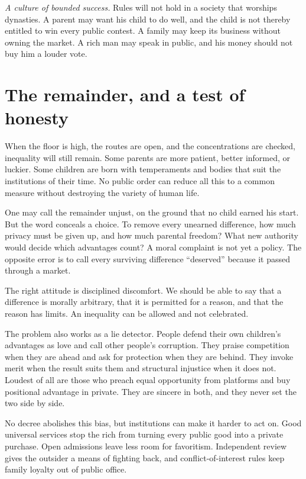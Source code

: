 \documentclass[12pt,a4paper]{book}
\begin{document}
\emph{A culture of bounded success.} Rules will not hold in a society that worships dynasties. A parent may want his child to do well, and the child is not thereby entitled to win every public contest. A family may keep its business without owning the market. A rich man may speak in public, and his money should not buy him a louder vote.

\section{The remainder, and a test of honesty}

When the floor is high, the routes are open, and the concentrations are checked, inequality will still remain. Some parents are more patient, better informed, or luckier. Some children are born with temperaments and bodies that suit the institutions of their time. No public order can reduce all this to a common measure without destroying the variety of human life.

One may call the remainder unjust, on the ground that no child earned his start. But the word conceals a choice. To remove every unearned difference, how much privacy must be given up, and how much parental freedom? What new authority would decide which advantages count? A moral complaint is not yet a policy. The opposite error is to call every surviving difference ``deserved'' because it passed through a market.

The right attitude is disciplined discomfort. We should be able to say that a difference is morally arbitrary, that it is permitted for a reason, and that the reason has limits. An inequality can be allowed and not celebrated.

The problem also works as a lie detector. People defend their own children's advantages as love and call other people's corruption. They praise competition when they are ahead and ask for protection when they are behind. They invoke merit when the result suits them and structural injustice when it does not. Loudest of all are those who preach equal opportunity from platforms and buy positional advantage in private. They are sincere in both, and they never set the two side by side.

No decree abolishes this bias, but institutions can make it harder to act on. Good universal services stop the rich from turning every public good into a private purchase. Open admissions leave less room for favoritism. Independent review gives the outsider a means of fighting back, and conflict-of-interest rules keep family loyalty out of public office.
\end{document}

